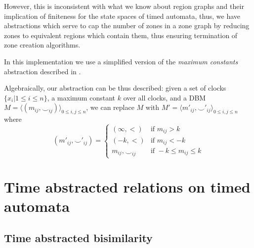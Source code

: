 \documentclass[a4paper]{llncs}
\begin{document}
However, this is inconsistent with what
we know about region graphs and their
implication of finiteness for the state spaces of timed automata,
thus, we have abstractions which serve to cap the number of zones in a
zone graph by reducing zones to equivalent regions which contain them,
thus ensuring termination of zone creation algorithms.

In this implementation we use a simplified version of the
\emph{maximum constants} abstraction described in
\cite{Behrmann03staticguard}.

Algebraically, our abstraction can be thus described: given a set of
clocks $\{x_i | 1 \leq i \leq n \}$, a maximum constant $k$ over all
clocks, and a DBM $M = \langle (m_{ij}, \smile _{ij})\rangle _{0 \leq
  i,j \leq n} $, we can replace $M$ with $M' = \langle m'_{ij}, \smile
'_{ij}\rangle _{0 \leq i,j \leq n} $ where
\begin{displaymath}
  (m'_{ij}, \smile'_{ij}) =
    \begin{cases}
      (\infty, <)  & \mbox{if } m_{ij} > k \\
      (-k, <)  & \mbox{if } m_{ij} < -k \\
      m_{ij}, \smile _{ij} & \mbox{if } -k \leq m_{ij} \leq k
    \end{cases}
\end{displaymath}

\section{Time abstracted relations on timed automata}

\subsection{Time abstracted bisimilarity}
\end{document}
